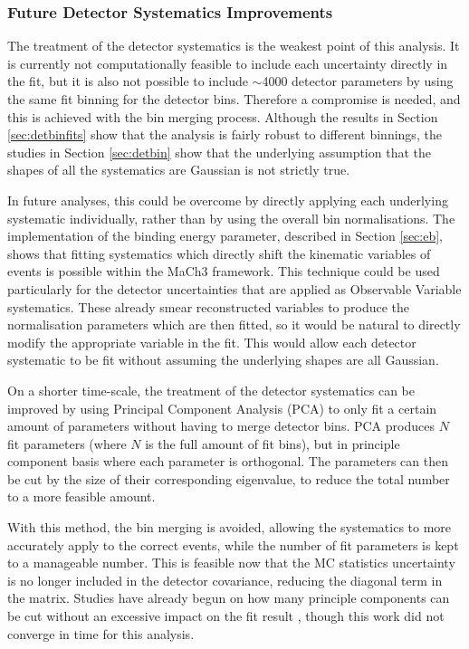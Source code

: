 \subsubsection{Future Detector Systematics Improvements}\label{sec:detimprove}

The treatment of the detector systematics is the weakest point of this analysis. It is currently not computationally feasible to include each uncertainty directly in the fit, but it is also not possible to include $\sim$4000 detector parameters by using the same fit binning for the detector bins. Therefore a compromise is needed, and this is achieved with the bin merging process. Although the results in Section \ref{sec:detbinfits} show that the analysis is fairly robust to different binnings, the studies in Section \ref{sec:detbin} show that the underlying assumption that the shapes of all the systematics are Gaussian is not strictly true. 

In future analyses, this could be overcome by directly applying each underlying systematic individually, rather than by using the overall bin normalisations. The implementation of the binding energy parameter, described in Section \ref{sec:eb}, shows that fitting systematics which directly shift the kinematic variables of events is possible within the MaCh3 framework. This technique could be used particularly for the detector uncertainties that are applied as Observable Variable systematics. These already smear reconstructed variables to produce the normalisation parameters which are then fitted, so it would be natural to directly modify the appropriate variable in the fit. This would allow each detector systematic to be fit without assuming the underlying shapes are all Gaussian.

On a shorter time-scale, the treatment of the detector systematics can be improved by using Principal Component Analysis (PCA) to only fit a certain amount of parameters without having to merge detector bins. PCA produces $N$ fit parameters (where $N$ is the full amount of fit bins), but in principle component basis where each parameter is orthogonal. The parameters can then be cut by the size of their corresponding eigenvalue, to reduce the total number to a more feasible amount.

With this method, the bin merging is avoided, allowing the systematics to more accurately apply to the correct events, while the number of fit parameters is kept to a manageable number. This is feasible now that the MC statistics uncertainty is no longer included in the detector covariance, reducing the diagonal term in the matrix. Studies have already begun on how many principle components can be cut without an excessive impact on the fit result \cite{tn395}, though this work did not converge in time for this analysis.

